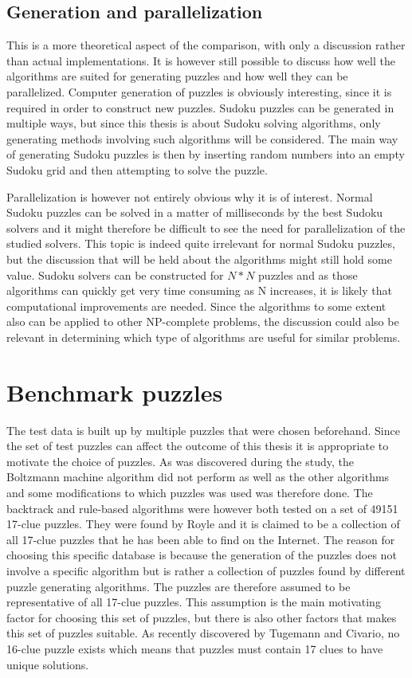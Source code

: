 \documentclass[a4paper,11pt]{kth-mag}
\begin{document}
\subsection{Generation and parallelization}
This is a more theoretical aspect of the comparison, with only a discussion rather than actual implementations.
It is however still possible to discuss how well the algorithms are suited for generating puzzles and how well they can be parallelized. 
Computer generation of puzzles is obviously interesting, since it is required in order to construct new puzzles.
Sudoku puzzles can be generated in multiple ways, but since this thesis is about Sudoku solving algorithms, only generating methods involving such algorithms will be considered.
The main way of generating Sudoku puzzles is then by inserting random numbers into an empty Sudoku grid and then attempting to solve the puzzle.

Parallelization is however not entirely obvious why it is of interest. 
Normal Sudoku puzzles can be solved in a matter of milliseconds by the best Sudoku solvers and it might therefore be difficult to see the need for parallelization of the studied solvers. 
This topic is indeed quite irrelevant for normal Sudoku puzzles, but the discussion that will be held about the algorithms might still hold some value.
Sudoku solvers can be constructed for $N*N$ puzzles and as those algorithms can quickly get very time consuming as N increases, it is likely that computational improvements are needed.
Since the algorithms to some extent also can be applied to other NP-complete problems, the discussion could also be relevant in determining which type of algorithms are useful for similar problems. 

\FloatBarrier
\section{Benchmark puzzles}
\label{sec:benchmarkPuzzles}
The test data is built up by multiple puzzles that were chosen beforehand.
Since the set of test puzzles can affect the outcome of this thesis it is appropriate to motivate the choice of puzzles.
As was discovered during the study, the Boltzmann machine algorithm did not perform as well as the other algorithms and some modifications to which puzzles was used was therefore done.
The backtrack and rule-based algorithms were however both tested on a set of 49151 17-clue puzzles. 
They were found by Royle and it is claimed to be a collection of all 17-clue puzzles that he has been able to find on the Internet.\cite{database} 
The reason for choosing this specific database is because the generation of the puzzles does not involve a specific algorithm but is rather a collection of puzzles found by different puzzle generating algorithms.  
The puzzles are therefore assumed to be representative of all 17-clue puzzles. 
This assumption is the main motivating factor for choosing this set of puzzles, but there is also other factors that makes this set of puzzles suitable. 
As recently discovered by Tugemann and Civario, no 16-clue puzzle exists which means that puzzles must contain 17 clues to have unique solutions.\cite{17clueProof}  
\end{document}

